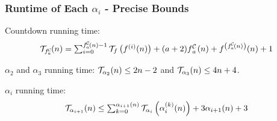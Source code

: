 \begin{frame}
\frametitle{Runtime of Each $\alpha_i$ - Precise Bounds}

Countdown running time:
\begin{equation*}
\textstyle \runtime_{\cdt{f}{a}}(n) =
\sum_{i=0}^{\cdt{f}{a}(n) - 1} \runtime_f\left(f^{(i)}(n)\right)
+ (a + 2)\cdt{f}{a}(n) + f^{\left(\cdt{f}{a}(n)\right)}(n) + 1
\end{equation*}

\smallskip

$\alpha_2$ and $\alpha_3$ running time: $\mathcal{T}_{\alpha_2}(n) \le 2n - 2$ and $\mathcal{T}_{\alpha_3}(n) \le 4n + 4$.

\bigskip 

$\alpha_i$ running time:
\begin{equation*}
\textstyle \mathcal{T}_{\alpha_{i+1}}(n) \le \sum_{k=0}^{\alpha_{i+1}(n)}\mathcal{T}_{\alpha_i}\left( \alpha_i^{(k)}(n)\right) + 3\alpha_{i+1}(n) + 3
\end{equation*}

\smallskip
{}

\end{frame}



